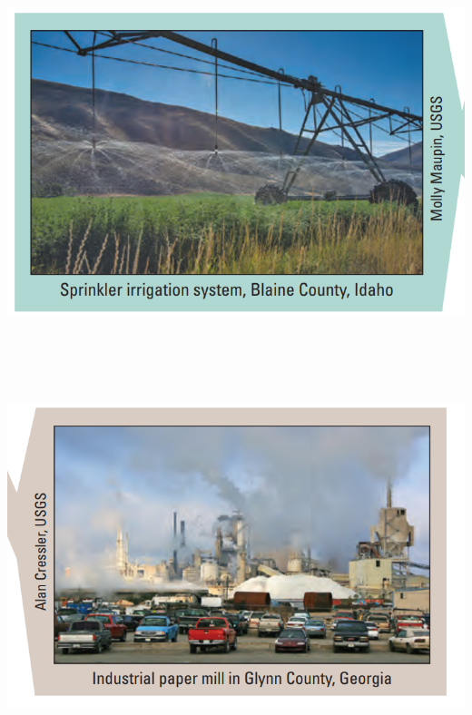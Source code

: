 \documentclass[]{article}
\begin{document}
\includegraphics[width=\textwidth,height=4.16667in]{figures/m10_irrigation.png}

\hypertarget{section-19}{%
\subsection{}\label{section-19}}

\includegraphics[width=\textwidth,height=4.16667in]{figures/m10_industrial.png}

\hypertarget{section-20}{%
\subsection{}\label{section-20}}
\end{document}
